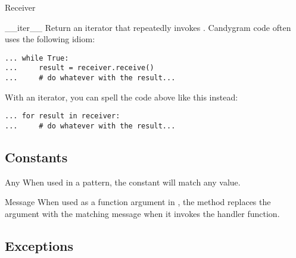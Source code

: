 \documentclass{howto}
\begin{document}
\begin{classdesc}{Receiver}{}
\begin{methoddesc}{__iter__}{}
Return an iterator that repeatedly invokes . Candygram code
often uses the following idiom:
\begin{verbatim}
... while True:
...     result = receiver.receive()
...     # do whatever with the result...
\end{verbatim}
With an iterator, you can spell the code above like this instead:
\begin{verbatim}
... for result in receiver:
...     # do whatever with the result...
\end{verbatim}
\end{methoddesc}

\end{classdesc}



\subsection{Constants}

\begin{datadesc}{Any}
When used in a pattern, the  constant will match any value.
\end{datadesc}

\begin{datadesc}{Message}
When used as a function argument in , the
 method replaces the argument with the matching
message when it invokes the handler function.
\end{datadesc}



\subsection{Exceptions}
\end{document}

